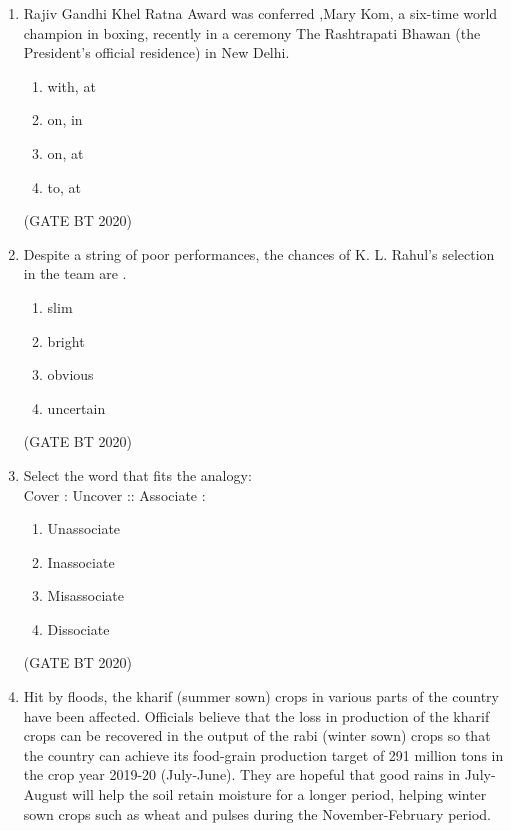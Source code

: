 \documentclass[journal,12pt,onecolumn]{IEEEtran}
\theoremstyle{remark}
\begin{document}
\begin{enumerate}[label=Q\arabic*:]

\item Rajiv Gandhi Khel Ratna Award was conferred   ,Mary Kom, a six-time world champion in boxing, recently in a ceremony      The Rashtrapati Bhawan (the President's official residence) in New Delhi.

\begin{multicols}{2}
\begin{enumerate}

\item with, at
\item on, in
\item on, at 
\item to, at  

\end{enumerate}
\end{multicols}\hfill(GATE BT 2020)

\item Despite a string of poor performances, the chances of K. L. Rahul's selection in the team are .

\begin{multicols}{4}
\begin{enumerate}
\item slim
\item bright
\item obvious
\item uncertain 

\end{enumerate}
\end{multicols}
\hfill(GATE BT 2020)

\item Select the word that fits the analogy: \\
Cover : Uncover :: Associate : 

\begin{multicols}{4}
\begin{enumerate}

\item Unassociate
\item Inassociate
\item Misassociate
\item Dissociate 

\end{enumerate}
\end{multicols}\hfill(GATE BT 2020)

\item Hit by floods, the kharif (summer sown) crops in various parts of the country have been affected. Officials believe that the loss in production of the kharif crops can be recovered in the output of the rabi (winter sown) crops so that the country can achieve its food-grain production target of 291 million tons in the crop year 2019-20 (July-June). They are hopeful that good rains in July-August will help the soil retain moisture for a longer period, helping winter sown crops such as wheat and pulses during the November-February period.\\


\end{enumerate}
\end{document}
